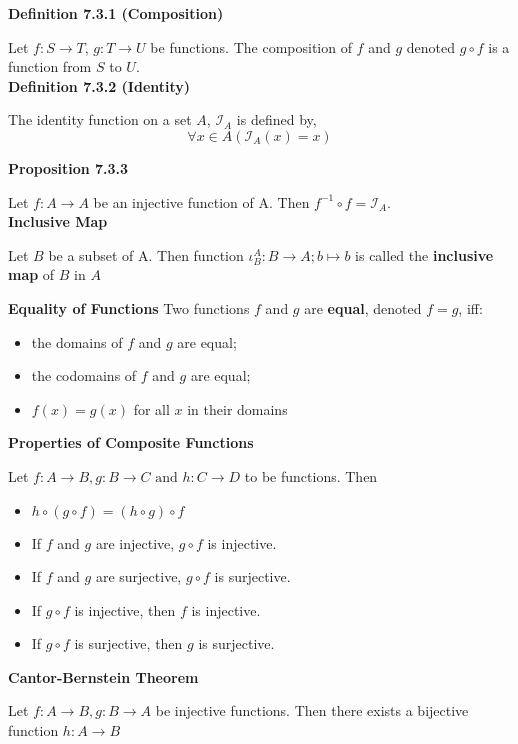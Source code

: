 \documentclass[a4paper]{article}
\newcommand{\subheading}[1]{{\scriptsize\textbf{#1}}}
\begin{document}
\begin{multicols*}{4}
\subheading{Definition 7.3.1 (Composition)}

Let $f : S \rightarrow T$, $g: T \rightarrow U$ be functions. The composition of
$f$ and $g$ denoted $g \circ f$ is a function from $S$ to $U$.\\

\subheading{Definition 7.3.2 (Identity)}

The identity function on a set $A$, $\mathcal{I}_A$ is defined by,
$$\forall x \in A(\mathcal{I}_A(x) = x)$$

\subheading{Proposition 7.3.3}

Let $f : A \rightarrow A$ be an injective function of A. Then $f^{-1} \circ f =
\mathcal{I}_A$.\\

\subheading{Inclusive Map}

Let $B$ be a subset of A. Then function $\iota^A_B: B \rightarrow A; b \mapsto b$ is called the \textbf{inclusive map} of $B$ in $A$

\subheading{Equality of Functions}
Two functions $f$ and $g$ are \textbf{equal}, denoted $f = g$, iff:
\begin{itemize}
	\item the domains of $f$ and $g$ are equal;
	\item the codomains of $f$ and $g$ are equal;
	\item $f(x) = g(x)$ for all $x$ in their domains
\end{itemize}

\subheading{Properties of Composite Functions}

Let $f: A \rightarrow B, g: B \rightarrow C \text{ and } h: C \rightarrow D$ to be functions. Then
\begin{itemize}
	\item $h \circ (g \circ f) = (h \circ g) \circ f$
	\item If $f$ and $g$ are injective, $g \circ f$ is injective.
	\item If $f$ and $g$ are surjective, $g \circ f$ is surjective.
	\item If $g \circ f$ is injective, then $f$ is injective.
	\item If $g \circ f$ is surjective, then $g$ is surjective.
\end{itemize}

\subheading{Cantor-Bernstein Theorem}

Let  $f: A \rightarrow B, g: B \rightarrow A$ be injective functions. Then there exists a bijective function $h: A \rightarrow B$\\


\end{multicols*}
\end{document}
